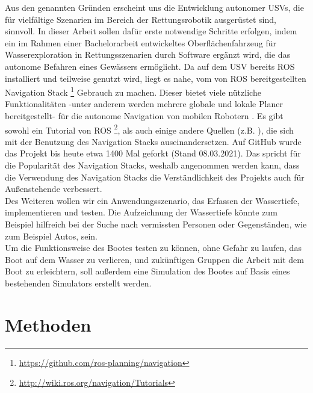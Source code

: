 \documentclass[11pt]{article}
\begin{document}
Aus den genannten Gründen erscheint uns die Entwicklung autonomer USVs, die für vielfältige Szenarien im Bereich der Rettungsrobotik ausgerüstet sind, sinnvoll. In dieser Arbeit sollen dafür erste notwendige Schritte erfolgen, indem ein im Rahmen einer Bachelorarbeit entwickeltes Oberflächenfahrzeug für Wasserexploration in Rettungsszenarien durch Software ergänzt wird, die das autonome Befahren eines Gewässers ermöglicht. Da auf dem USV bereits ROS installiert und teilweise genutzt wird, liegt es nahe, vom von ROS bereitgestellten Navigation Stack \footnote{\url{https://github.com/ros-planning/navigation}} Gebrauch zu machen. Dieser bietet viele nützliche Funktionalitäten -unter anderem werden mehrere globale und lokale Planer bereitgestellt- für die autonome Navigation von mobilen Robotern \cite{zheng2019ros}. Es gibt sowohl ein Tutorial von ROS \footnote{\url{http://wiki.ros.org/navigation/Tutorials}}, als auch einige andere Quellen (z.B. \cite{zheng2019ros}), die sich mit der Benutzung des Navigation Stacks auseinandersetzen. Auf GitHub wurde das Projekt bis heute etwa 1400 Mal geforkt (Stand 08.03.2021). Das spricht für die Popularität des Navigation Stacks, weshalb angenommen werden kann, dass die Verwendung des Navigation Stacks die Verständlichkeit des Projekts auch für Außenstehende verbessert.\\

Des Weiteren wollen wir ein Anwendungsszenario, das Erfassen der Wassertiefe, implementieren und testen. Die Aufzeichnung der Wassertiefe könnte zum Beispiel hilfreich bei der Suche nach vermissten Personen oder Gegenständen, wie zum Beispiel Autos, sein.\\

Um die Funktionsweise des Bootes testen zu können, ohne Gefahr zu laufen, das Boot auf dem Wasser zu verlieren, und zukünftigen Gruppen die Arbeit mit dem Boot zu erleichtern, soll außerdem eine Simulation des Bootes auf Basis eines bestehenden Simulators erstellt werden.

\section{Methoden}
\end{document}
